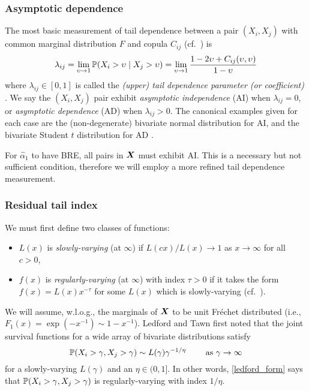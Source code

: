 \subsubsection{Asymptotic dependence} \label{ssec:asymp_dep}

The most basic measurement of tail dependence between a pair $(X_i, X_j)$ with common marginal distribution $F$ and copula $C_{ij}$ (cf.\ \cite{joe1997multivariate,nelsen2006introduction}) is
\[
	\lambda_{ij} = \lim_{\upsilon\to1} \operatorname{{\mathbb P}}(X_i > \upsilon \mid X_j > \upsilon) = \lim_{\upsilon \to 1} \frac{1 - 2 \upsilon + C_{ij}(\upsilon,\upsilon)}{1-\upsilon}
\]
where $\lambda_{ij} \in [0,1]$ is called the \emph{(upper) tail dependence parameter (or coefficient)} \cite{joe1997multivariate,mcneil2015quantitative}. We say the $(X_i,X_j)$ pair exhibit \emph{asymptotic independence} (AI) when $\lambda_{ij} = 0$, or \emph{asymptotic dependence} (AD) when $\lambda_{ij} > 0$. The canonical examples given for each case are the (non-degenerate) bivariate normal distribution for AI, and the bivariate Student $t$ distribution for AD \cite{sibuya1960bivariate}.

For $\hat{\alpha}_1$ to have BRE, all pairs in $\bm{X}$ must exhibit AI. This is a necessary but not sufficient condition, therefore we will employ a more refined tail dependence measurement.

\subsubsection{Residual tail index}

We must first define two classes of functions:
\begin{itemize}
\item $L(x)$ is \emph{slowly-varying} (at $\infty$) if $L(cx)/L(x) \to 1$ as $x \to \infty$ for all $c > 0$,
\item $f(x)$ is \emph{regularly-varying} (at $\infty$) with index $\tau > 0$ if it takes the form $f(x) = L(x) x^{-\tau}$ for some $L(x)$ which is slowly-varying (cf.\ \cite{bingham1989regular,resnick2013extreme}).
\end{itemize}

We will assume, w.l.o.g., the marginals of $\bm{X}$ to be unit Fr\'echet distributed (i.e., $F_1(x) = \exp(-x^{-1}) \sim 1 - x^{-1}$). Ledford and Tawn \cite{ledford1996statistics,ledford1997modelling,ledford1998concomitant} first noted that the joint survival functions for a wide array of bivariate distributions satisfy
\begin{equation} \label{ledford_form}
	\operatorname{{\mathbb P}}(X_i > \gamma, X_j > \gamma) \sim L(\gamma) \gamma^{-1/\eta} \qquad \text{ as } \gamma \to \infty
\end{equation}
for a slowly-varying $L(\gamma)$ and an $\eta \in (0, 1]$. In other words, \eqref{ledford_form} says that $\operatorname{{\mathbb P}}(X_i > \gamma, X_j > \gamma)$ is regularly-varying with index $1/\eta$.

